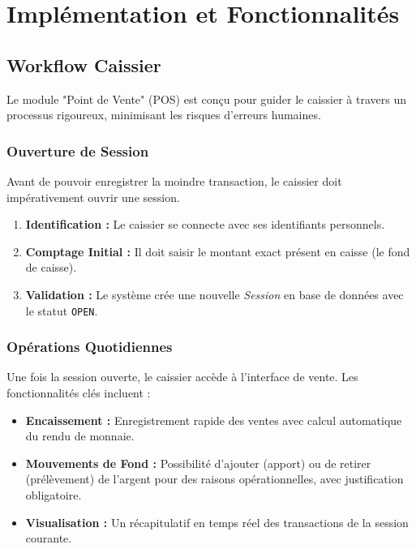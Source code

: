 \chapter{Implémentation et Fonctionnalités}

\section{Workflow Caissier}
Le module "Point de Vente" (POS) est conçu pour guider le caissier à travers un processus rigoureux, minimisant les risques d'erreurs humaines.

\subsection{Ouverture de Session}
Avant de pouvoir enregistrer la moindre transaction, le caissier doit impérativement ouvrir une session.
\begin{enumerate}
    \item \textbf{Identification :} Le caissier se connecte avec ses identifiants personnels.
    \item \textbf{Comptage Initial :} Il doit saisir le montant exact présent en caisse (le fond de caisse).
    \item \textbf{Validation :} Le système crée une nouvelle \textit{Session} en base de données avec le statut \texttt{OPEN}.
\end{enumerate}

\subsection{Opérations Quotidiennes}
Une fois la session ouverte, le caissier accède à l'interface de vente. Les fonctionnalités clés incluent :
\begin{itemize}
    \item \textbf{Encaissement :} Enregistrement rapide des ventes avec calcul automatique du rendu de monnaie.
    \item \textbf{Mouvements de Fond :} Possibilité d'ajouter (apport) ou de retirer (prélèvement) de l'argent pour des raisons opérationnelles, avec justification obligatoire.
    \item \textbf{Visualisation :} Un récapitulatif en temps réel des transactions de la session courante.
\end{itemize}


